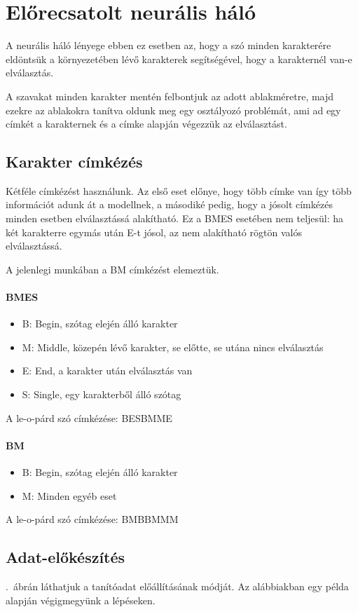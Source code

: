 \documentclass[a4paper, magyar]{article}
\newcommand{\Figref}[1]{\Aref{#1}.~ábr}
\begin{document}
\section{Előrecsatolt neurális háló}
A neurális háló lényege ebben ez esetben az, hogy a szó minden karakterére eldöntsük a környezetében lévő karakterek segítségével, hogy a karakternél van-e elválasztás.

A szavakat minden karakter mentén felbontjuk az adott ablakméretre, majd ezekre az ablakokra tanítva oldunk meg egy osztályozó problémát, ami ad egy címkét a karakternek és a címke alapján végezzük az elválasztást.
\subsection{Karakter címkézés}
\label{sec:cimke}
Kétféle címkézést használunk. Az első eset előnye, hogy több címke van így több információt adunk át a modellnek, a másodiké pedig, hogy a jósolt címkézés minden esetben elválasztássá alakítható. Ez a BMES esetében nem teljesül: ha két karakterre egymás után E-t jósol, az nem alakítható rögtön valós elválasztássá.

A jelenlegi munkában a BM címkézést elemeztük.
\paragraph{BMES}
\begin{itemize}
	\item B: Begin, szótag elején álló karakter
	\item M: Middle, közepén lévő karakter, se előtte, se utána nincs elválasztás
	\item E: End, a karakter után elválasztás van
	\item S: Single, egy karakterből álló szótag
\end{itemize}
A
{\selectfont
	le-o-párd%
}
szó címkézése:
{\selectfont
	BESBMME%
}
\paragraph{BM}
\begin{itemize}
	\item B: Begin, szótag elején álló karakter
	\item M: Minden egyéb eset
\end{itemize}
A
{\selectfont
	le-o-párd%
}
szó címkézése:
{\selectfont
	BMBBMMM%
}
\subsection{Adat-előkészítés}
\Figref{fig:char}án láthatjuk a tanítóadat előállításának módját. Az alábbiakban egy példa alapján végigmegyünk a lépéseken.
\end{document}
